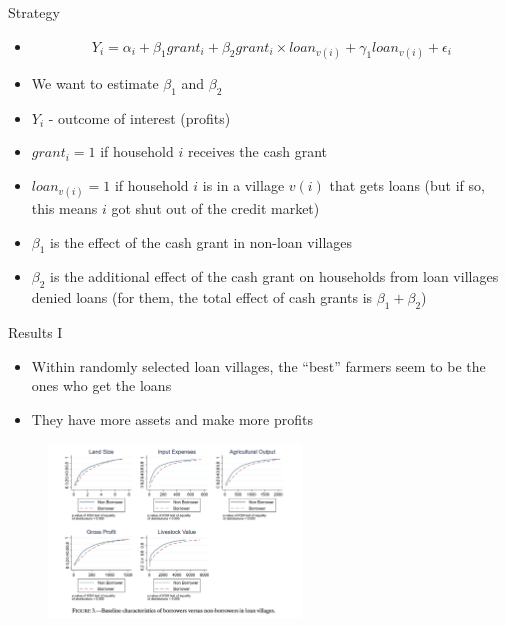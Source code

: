 \documentclass[11pt,notes=hide,aspectratio=169,mathserif]{beamer}
\begin{document}
\begin{frame}{Strategy}
\begin{itemize}
    \item 
    \begin{equation*}
        Y_i = \alpha_i + \beta_1 grant_i + \beta_2 grant_i\times loan_{v(i)}+ \gamma_1 loan_{v(i)} + \epsilon_i
    \end{equation*}
    \pause \item We want to estimate $\beta_1$ and $\beta_2$
    \pause \item $Y_i$ - outcome of interest (profits)
    \pause \item $grant_i = 1$ if household $i$ receives the cash grant
    \pause \item $loan_{v(i)} = 1$ if household $i$ is in a village $v(i)$ that gets loans (but if so, this means $i$ got shut out of the credit market)
    \pause \item $\beta_1$ is the effect of the cash grant in non-loan villages
    \pause \item $\beta_2$ is the additional effect of the cash grant on households from loan villages denied loans (for them, the total effect of cash grants is $\beta_1+\beta_2$)
\end{itemize}
\end{frame}



\begin{frame}{Results I}
\begin{itemize}
    \item Within randomly selected loan villages, the ``best'' farmers seem to be the ones who get the loans
    \pause \item They have more assets and make more profits 
\end{itemize}
\pause \begin{figure}
    \centering
    \includegraphics[width=0.6\textwidth]{inputs/fig4.png}
\end{figure}
\end{frame}
\end{document}
